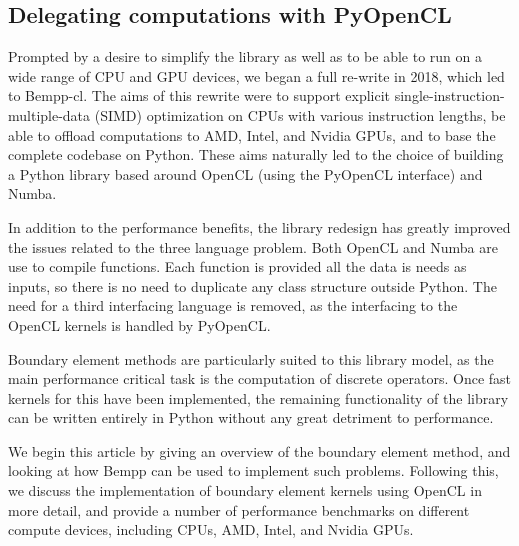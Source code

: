 \subsection{Delegating computations with PyOpenCL}
Prompted by a desire to simplify the library as well as to be able to run on a wide range of CPU and GPU devices, we began a full re-write in 2018, which led to Bempp-cl. The aims of this rewrite were to support explicit single-instruction-multiple-data (SIMD) optimization on CPUs with various instruction lengths, be able to offload computations to AMD, Intel, and Nvidia GPUs, and to base the complete codebase on Python. These aims naturally led to the choice of building a Python library based around OpenCL (using the PyOpenCL interface) and Numba.

In addition to the performance benefits, the library redesign has greatly improved the issues related to the three language problem. Both OpenCL and Numba are use to compile functions. Each function is provided all the data is needs as inputs, so there is no need to duplicate any class structure outside Python. The need for a third interfacing language is removed, as the interfacing to the OpenCL kernels is handled by PyOpenCL.

Boundary element methods are particularly suited to this library model, as the main performance critical task is the computation of discrete operators. Once fast kernels for this have been implemented, the remaining functionality of the library can be written entirely in Python without any great detriment to performance.

\bigskip

We begin this article by giving an overview of the boundary element method, and looking at how Bempp can be used to implement such problems. Following this, we discuss the implementation of boundary element kernels using OpenCL in more detail, and provide a number of performance benchmarks on different compute devices, including CPUs, AMD, Intel, and Nvidia GPUs.

